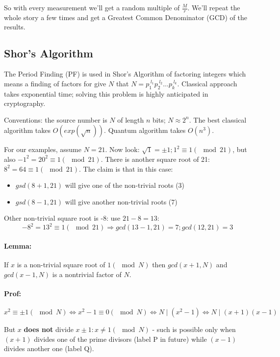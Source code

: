 \documentclass{scrartcl}
\newcommand{\means}{\Rightarrow} %
\newcommand{\same}{\Leftrightarrow} %
\begin{document}
So with every measurement we'll get a random multiple of $\frac Mr$. We'll
repeat the whole story a few times and get a Greatest Common Denominator (GCD)
of the results.

\subsection{Shor's Algorithm}
\label{sec:ShorsAlgorithm}

The Period Finding (PF) is used in Shor's Algorithm of factoring integers which
means a finding of factors for give $N$ that $N = p_1^{\;l_1} p_2^{\;l_2} \dots
p_k^{\;l_k}$. Classical approach takes exponential time; solving this problem is
highly anticipated in cryptography.

Conventions: the source number is $N$ of length $n$ bits; $N \approx 2^n$. The
best classical algorithm takes $O(exp(\sqrt n))$. Quantum algorithm takes
$O(n^3)$.

For our examples, assume $N = 21$. Now look: $\sqrt 1 = \pm 1; 1^2 \equiv 1
(\mod 21)$, but also $-1^2 = 20^2 \equiv 1 (\mod 21)$. There is another square
root of 21: $8^2 = 64 \equiv 1 (\mod 21)$. The claim is that in this case:
\begin{itemize}
\item $gsd(8 + 1, 21)$ will give one of the non-trivial roots (3)
\item $gsd(8 - 1, 21)$ will give another non-trivial roots (7)
\end{itemize}

Other non-trivial square root is -8: use $21-8 = 13$:
$$-8^2 = 13^2 \equiv 1 (\mod 21) \means gcd(13-1, 21) = 7; gcd(12, 21) = 3$$

\paragraph{Lemma:} If $x$ is a non-trivial square root of $1 (\mod N)$ then
$gcd(x+1, N)$ and $gcd(x-1, N)$ is a nontrivial factor of $N$.

\paragraph{Prof:} $x^2 \equiv \pm 1(\mod N) \same x^2 - 1 \equiv 0 (\mod N)
\same N \mid (x^2-1) \same N \mid (x+1)(x-1)$

But $x$ {\bf does not} divide $x\pm1: x \neq1(\mod N)$ - such is possible only
when $(x+1)$ divides one of the prime divisors (label P in future) while $(x-1)$
divides another one (label Q).
\end{document}
